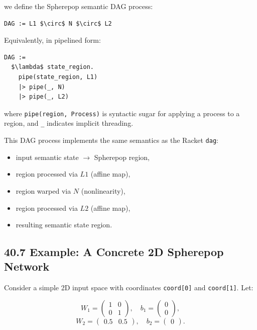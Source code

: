 \documentclass[12pt,letterpaper]{article}
\theoremstyle{remark}
\begin{document}
we define the Spherepop semantic DAG process:

\begin{verbatim}
DAG := L1 $\circ$ N $\circ$ L2
\end{verbatim}

Equivalently, in pipelined form:

\begin{verbatim}
DAG :=
  $\lambda$ state_region.
    pipe(state_region, L1)
    |> pipe(_, N)
    |> pipe(_, L2)
\end{verbatim}

where \verb|pipe(region, Process)| is syntactic sugar for applying a process to a region, and \verb|_| indicates implicit threading.

This DAG process implements the same semantics as the Racket \verb|dag|:

\begin{itemize}
  \item input semantic state $\to$ Spherepop region,
  \item region processed via $L1$ (affine map),
  \item region warped via $N$ (nonlinearity),
  \item region processed via $L2$ (affine map),
  \item resulting semantic state region.
\end{itemize}

\subsection{40.7 Example: A Concrete 2D Spherepop Network}

Consider a simple 2D input space with coordinates \verb|coord[0]| and \verb|coord[1]|. Let:

\[
W_1 =
\begin{pmatrix}
1 & 0 \\
0 & 1
\end{pmatrix}, \quad
b_1 =
\begin{pmatrix}
0 \\ 0
\end{pmatrix},
\]
\[
W_2 =
\begin{pmatrix}
0.5 & 0.5
\end{pmatrix}, \quad
b_2 =
\begin{pmatrix}
0
\end{pmatrix}.
\]
\end{document}
